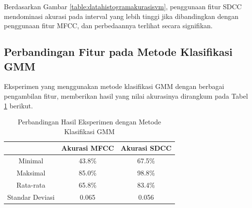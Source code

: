   Berdasarkan Gambar \ref{table:datahistogramakurasisvm}, penggunaan fitur SDCC mendominasi akurasi pada interval yang lebih tinggi jika dibandingkan dengan penggunaan fitur MFCC, dan perbedaannya terlihat secara signifikan.







  \subsection{Perbandingan Fitur pada Metode Klasifikasi GMM}
  Eksperimen yang menggunakan metode klasifikasi GMM dengan berbagai pengambilan fitur, memberikan hasil yang nilai akurasinya dirangkum pada Tabel \ref{table:perbandingangmm} berikut.

  \begin{table}
    \centering
    \caption{Perbandingan Hasil Eksperimen dengan Metode Klasifikasi GMM}
    \begin{tabular}{|c|c|c|}
      \hline
       & Akurasi MFCC & Akurasi SDCC \\ \hline
      Minimal         & 43.8\% & 67.5\% \\ \hline
      Maksimal        & 85.0\% & 98.8\% \\ \hline
      Rata-rata       & 65.8\% & 83.4\% \\ \hline
      Standar Deviasi & 0.065  & 0.056  \\ \hline
    \end{tabular}
    \label{table:perbandingangmm}
  \end{table}

